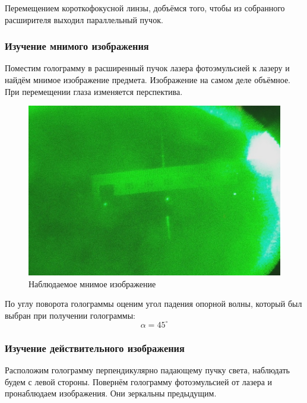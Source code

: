 \documentclass{article}
\begin{document}
Перемещением короткофокусной линзы, добъёмся того, чтобы из собранного расширителя выходил параллельный пучок.

\subsubsection{Изучение мнимого изображения}
Поместим голограмму в расширенный пучок лазера фотоэмульсией к лазеру и найдём мнимое изображение предмета. Изображение на самом деле объёмное.
При перемещении глаза изменяется перспектива.

\begin{figure}[H]
  \centering
  \includegraphics[width=\textwidth]{image.jpg}
  \caption{Наблюдаемое мнимое изображение}
\end{figure}

По углу поворота голограммы оценим угол падения опорной волны, который был выбран при получении голограммы:
\[ \alpha = 45^\circ \]

\subsubsection{Изучение действительного изображения}
Расположим голограмму перпендикулярно падающему пучку света, наблюдать будем с левой стороны. Повернём голограмму фотоэмульсией от лазера и пронаблюдаем
изображения. Они зеркальны предыдущим.
\end{document}
